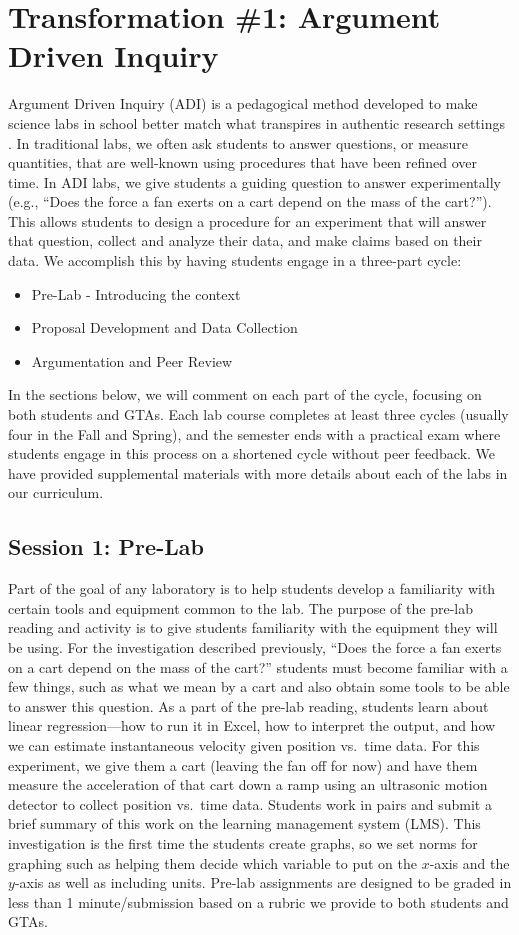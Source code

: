 \documentclass[aip, numerical, preprint]{revtex4-2}
\begin{document}
\section{Transformation \#1: Argument Driven Inquiry}
Argument Driven Inquiry (ADI) is a pedagogical method developed to make science labs in school
better match what transpires in authentic research settings
\citep{Walker2011,Sampson2011,Walker2016}.  In traditional labs, we often ask students to
answer questions, or measure quantities, that are well-known using procedures that have been
refined over time.  In ADI labs, we give students a guiding question to answer experimentally
(e.g., ``Does the force a fan exerts on a cart depend on the mass of the cart?''). This allows
students to design a procedure for an experiment that will answer that question, collect and
analyze their data, and make claims based on their data.  We accomplish this by having students
engage in a three-part cycle:
\begin{itemize}
  \item Pre-Lab - Introducing the context
  \item Proposal Development and Data Collection
  \item Argumentation and Peer Review
\end{itemize}
In the sections below, we will comment on each part of the cycle, focusing on both students and
GTAs. Each lab course completes at least three cycles (usually four in the Fall and Spring),
and the semester ends with a practical exam where students engage in this process on a
shortened cycle without peer feedback.\cite{Wolf2019} We have provided supplemental
materials with more details about each of the labs in our curriculum.

\subsection{Session 1: Pre-Lab}
Part of the goal of any laboratory is to help students develop a familiarity with certain tools
and equipment common to the lab.  The purpose of the pre-lab reading and activity is to give
students familiarity with the equipment they will be using.  For the investigation described
previously, ``Does the force a fan exerts on a cart depend on the mass of the cart?''  students
must become familiar with a few things, such as what we mean by a cart and also obtain some
tools to be able to answer this question.  As a part of the pre-lab reading, students learn
about linear regression---how to run it in Excel, how to interpret the output, and how we can
estimate instantaneous velocity given position vs.\ time data. For this experiment, we give
them a cart (leaving the fan off for now) and have them measure the acceleration of that cart
down a ramp using an ultrasonic motion detector to collect position vs.\ time data.  Students
work in pairs and submit a brief summary of this work on the learning management system
(LMS). This investigation is the first time the students create graphs, so we set norms for
graphing such as helping them decide which variable to put on the $x$-axis and the $y$-axis as
well as including units.  Pre-lab assignments are designed to be graded in less than 1
minute/submission based on a rubric we provide to both students and GTAs.
\end{document}
